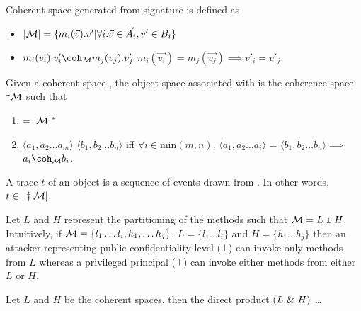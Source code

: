 \documentclass[acmsmall,screen,review, nonacm]{acmart}
\begin{document}
\begin{definition}
  Coherent space generated from signature \classpart is defined as
  \begin{itemize}
  \item $|\mathcal{M}| = \{ m_i(\vec{v}).v' | \forall i. \vec{v} \in \vec{A_i}, v' \in B_i  \}$
    \item $ m_i(\vec{v_i}).v'_i \coherent{\classpart} m_j(\vec{v_j}).v'_j$ \isdef $m_i(\vec{v_i}) = m_j(\vec{v_j}) \implies v'_i = v'_j $
  \end{itemize}
  
\end{definition}


\begin{definition}
  Given a coherent space \classpart, the object space associated with \classpart is the coherence space $\dagger \mathcal{M}$ such that
  \begin{enumerate}
  \item \abs{\dagger \classpart} = $|\mathcal{M}|^*$
    \item $\langle a_1, a_2 \dots a_m \rangle $ \coherent{\dagger \classpart} $\langle b_1, b_2 \dots b_n \rangle $ iff   $\forall i \in \text{min}(m, n)$.  $\langle a_1, a_2 \dots a_i \rangle $ =  $\langle b_1, b_2 \dots b_n \rangle \implies$ $a_i \coherent{\classpart} b_i$.
  \end{enumerate}
\end{definition}



\begin{definition}[Trace]
A trace $t$ of an object \classpart is a sequence of events drawn from \abs{\classpart}. In other words, $t \in |\dagger \mathcal{M}|$.
\end{definition}





Let $L$ and $H$ represent the partitioning of the methods such that $\mathcal{M} = L \uplus H$. Intuitively, if $\mathcal{M} = \{ l_1 \dots l_i, h_1, \dots h_j \}$,  $L = \{ l_1 \dots l_i\}$ and $H = \{ h_1 \dots h_j \}$ then an attacker representing public confidentiality level ($\bot$) can  invoke only methods from $L$ whereas a privileged principal ($\top$) can invoke either methods from either $L$ or $H$. 

\begin{definition}
Let $L$ and $H$ be the coherent spaces, then the direct product $(L ~\&~ H)$ \dots
\end{definition}
\end{document}
